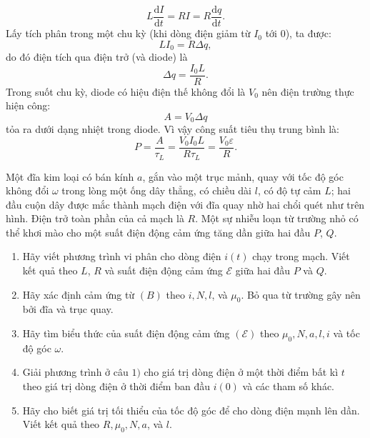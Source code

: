 \begin{loigiai}
\begin{enumerate}[1)]
        \[L\dfrac{\mathrm{d}I}{\mathrm{d}t}=RI=R\dfrac{\mathrm{d}q}{\mathrm{d}t}.\]
        Lấy tích phân trong một chu kỳ (khi dòng điện giảm từ $I_0$ tới 0), ta được:
        \[LI_0=R \Delta q,\]
        do đó điện tích qua điện trở (và diode) là \[\Delta q=\dfrac{I_0 L}{R}.\] Trong suốt chu kỳ, diode có hiệu điện thế không đổi là $V_0$ nên điện trường thực hiện công:
        \[A=V_0 \Delta q\]
        tỏa ra dưới dạng nhiệt trong diode. Vì vậy công suất tiêu thụ trung bình là:
        \[P=\dfrac{A}{\tau_L}=\dfrac{V_0 I_0 L}{R \tau_L}=\dfrac{V_0 \varepsilon}{R}.\]
    \end{enumerate}
\end{loigiai}


\begin{vd}
Một đĩa kim loại có bán kính $a$, gắn vào một trục mảnh, quay với tốc độ góc không đổi $\omega$ trong lòng một ống dây thẳng, có chiều dài $l$, có độ tự cảm $L$; hai đầu cuộn dây được mắc thành mạch điện với đĩa quay nhờ hai chổi quét như trên hình. Điện trở toàn phần của cả mạch là $R$. Một sự nhiễu loạn từ trường nhỏ có thể khơi mào cho một suất điện động cảm ứng tăng dần giữa hai đầu $P$, $Q$.
\begin{enumerate}[1)]
    \item Hãy viết phương trình vi phân cho dòng điện $i(t)$ chạy trong mạch. Viết kết quả theo $L$, $R$ và suất điện động cảm ứng $\mathcal{E}$ giữa hai đầu $P$ và $Q$.
    \item  Hãy xác định cảm ứng từ $(B)$ theo $i, N, l$, và $\mu_{0}$. Bỏ qua từ trường gây nên bởi đĩa và trục quay. 
    \item Hãy tìm biểu thức của suất điện động cảm ứng $(\mathcal{E})$ theo $\mu_{0}, N, a, l, i$ và tốc độ góc $\omega$.    
    \item Giải phương trình ở câu $1)$ cho giá trị dòng điện ở một thời điểm bất kì $t$ theo giá trị dòng điện ở thời điểm ban đầu $i(0)$ và các tham số khác.
    \item Hãy cho biết giá trị tối thiểu của tốc độ góc để cho dòng điện mạnh lên dần. Viết kết quả theo $R, \mu_{0}, N, a$, và $l$.
\begin{center}

\begin{tikzpicture}[x=0.75pt,y=0.75pt,yscale=-0.65,xscale=0.65,scale=0.7]


\end{tikzpicture}
\end{center}
\end{enumerate}
\end{vd}

